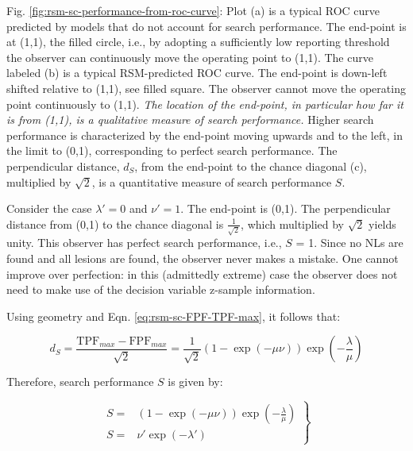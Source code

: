 \documentclass[
]{book}
\begin{document}
Fig. \ref{fig:rsm-sc-performance-from-roc-curve}: Plot (a) is a typical ROC curve predicted by models that do not account for search performance. The end-point is at (1,1), the filled circle, i.e., by adopting a sufficiently low reporting threshold the observer can continuously move the operating point to (1,1). The curve labeled (b) is a typical RSM-predicted ROC curve. The end-point is down-left shifted relative to (1,1), see filled square. The observer cannot move the operating point continuously to (1,1). \emph{The location of the end-point, in particular how far it is from (1,1), is a qualitative measure of search performance.} Higher search performance is characterized by the end-point moving upwards and to the left, in the limit to (0,1), corresponding to perfect search performance. The perpendicular distance, \(d_S\), from the end-point to the chance diagonal (c), multiplied by \(\sqrt{2}\), is a quantitative measure of search performance \(S\).

Consider the case \(\lambda' = 0\) and \(\nu' = 1\). The end-point is (0,1). The perpendicular distance from (0,1) to the chance diagonal is \(\frac{1}{\sqrt{2}}\), which multiplied by \(\sqrt{2}\) yields unity. This observer has perfect search performance, i.e., \(S\) = 1. Since no NLs are found and all lesions are found, the observer never makes a mistake. One cannot improve over perfection: in this (admittedly extreme) case the observer does not need to make use of the decision variable z-sample information.

Using geometry and Eqn. \eqref{eq:rsm-sc-FPF-TPF-max}, it follows that:

\begin{equation} 
d_S=\frac{\text{TPF}_{max}-\text{FPF}_{max}}{\sqrt{2}}=\frac{1}{\sqrt{2}}\left ( 1-\exp\left ( -\mu\nu \right ) \right )\exp\left ( -\frac{\lambda}{\mu} \right )
\label{eq:rsm-sc-perp-distance}
\end{equation}

Therefore, search performance \(S\) is given by:

\begin{equation} 
\left.
\begin{aligned}
S=&\left ( 1-\exp\left ( -\mu\nu \right ) \right )\exp\left ( -\frac{\lambda}{\mu} \right ) \\
S=&\nu' \exp\left ( -\lambda' \right )
\end{aligned}
\right \}
\label{eq:rsm-sc-search-performance}
\end{equation}
\end{document}
